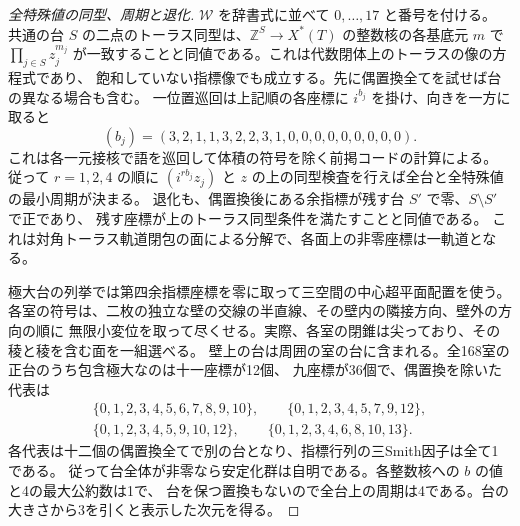 \begin{proof}[全特殊値の同型、周期と退化]
$\mathcal W$ を辞書式に並べて $0,\ldots,17$ と番号を付ける。
共通の台 $S$ の二点のトーラス同型は、$\mathbb Z^S\to X^*(T)$ の整数核の各基底元 $m$ で
$\prod_{j\in S} z_j^{m_j}$ が一致することと同値である。これは代数閉体上のトーラスの像の方程式であり、
飽和していない指標像でも成立する。先に偶置換全てを試せば台の異なる場合も含む。
一位置巡回は上記順の各座標に $i^{b_j}$ を掛け、向きを一方に取ると
\[
 (b_j)=(3,2,1,1,3,2,2,3,1,0,0,0,0,0,0,0,0,0).
\]
これは各一元接核で語を巡回して体積の符号を除く前掲コードの計算による。
従って $r=1,2,4$ の順に $(i^{rb_j}z_j)$ と $z$ の上の同型検査を行えば全台と全特殊値の最小周期が決まる。
退化も、偶置換後にある余指標が残す台 $S'$ で零、$S\setminus S'$ で正であり、
残す座標が上のトーラス同型条件を満たすことと同値である。
これは対角トーラス軌道閉包の面による分解で、各面上の非零座標は一軌道となる。

極大台の列挙では第四余指標座標を零に取って三空間の中心超平面配置を使う。
各室の符号は、二枚の独立な壁の交線の半直線、その壁内の隣接方向、壁外の方向の順に
無限小変位を取って尽くせる。実際、各室の閉錐は尖っており、その稜と稜を含む面を一組選べる。
壁上の台は周囲の室の台に含まれる。全168室の正台のうち包含極大なのは十一座標が12個、
九座標が36個で、偶置換を除いた代表は
\[
\begin{gathered}
 \{0,1,2,3,4,5,6,7,8,9,10\},\qquad
 \{0,1,2,3,4,5,7,9,12\},\\
 \{0,1,2,3,4,5,9,10,12\},\qquad
 \{0,1,2,3,4,6,8,10,13\}.
\end{gathered}
\]
各代表は十二個の偶置換全てで別の台となり、指標行列の三Smith因子は全て1である。
従って台全体が非零なら安定化群は自明である。各整数核への $b$ の値と4の最大公約数は1で、
台を保つ置換もないので全台上の周期は4である。台の大きさから3を引くと表示した次元を得る。
\end{proof}
